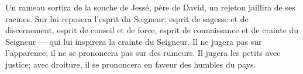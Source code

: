 Un rameau sortira de la souche de Jessé, père de David,
	un rejeton jaillira de ses racines.
Sur lui reposera l’esprit du Seigneur:
	esprit de sagesse et de discernement, esprit de conseil et de force,
	esprit de connaissance et de crainte du Seigneur
	--- qui lui inspirera la crainte du Seigneur.
Il ne jugera pas sur l’apparence;
	il ne se prononcera pas sur des rumeurs.
Il jugera les petits avec justice;
	avec droiture, il se prononcera en faveur des humbles du pays.
